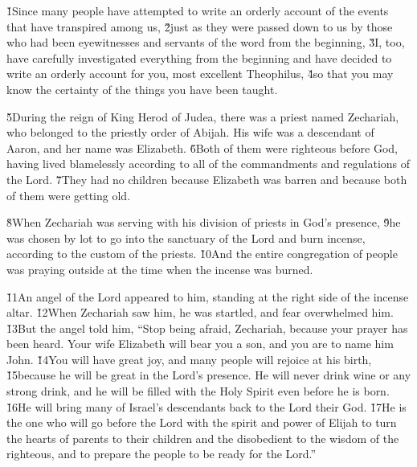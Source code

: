 


\v{1}Since many people have attempted to write an orderly account of the events that have transpired among us, \v{2}just as they were passed down to us by those who had been eyewitnesses and servants of the word from the beginning, \v{3}I, too, have carefully investigated everything from the beginning and have decided to write an orderly account for you, most excellent Theophilus, \v{4}so that you may know the certainty of the things you have been taught.

\v{5}During the reign of King Herod of Judea, there was a priest named Zechariah, who belonged to the priestly order of Abijah. His wife was a descendant of Aaron, and her name was Elizabeth. \v{6}Both of them were righteous before God, having lived blamelessly according to all of the commandments and regulations of the Lord. \v{7}They had no children because Elizabeth was barren and because both of them were getting old.

\v{8}When Zechariah was serving with his division of priests in God's presence, \v{9}he was chosen by lot to go into the sanctuary of the Lord and burn incense, according to the custom of the priests. \v{10}And the entire congregation of people was praying outside at the time when the incense was burned.

\v{11}An angel of the Lord appeared to him, standing at the right side of the incense altar. \v{12}When Zechariah saw him, he was startled, and fear overwhelmed him. \v{13}But the angel told him, ``Stop being afraid, Zechariah, because your prayer has been heard. Your wife Elizabeth will bear you a son, and you are to name him John. \v{14}You will have great joy, and many people will rejoice at his birth, \v{15}because he will be great in the Lord's presence. He will never drink wine or any strong drink, and he will be filled with the Holy Spirit even before he is born. \v{16}He will bring many of Israel's descendants back to the Lord their God. \v{17}He is the one who will go before the Lord with the spirit and power of Elijah to turn the hearts of parents to their children and the disobedient to the wisdom of the righteous, and to prepare the people to be ready for the Lord.''

